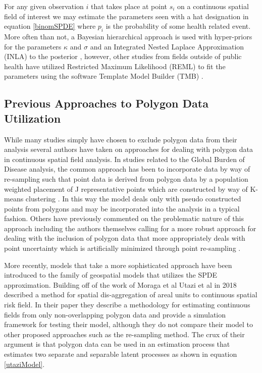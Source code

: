 \documentclass{article}
\begin{document}
For any given observation $i$ that takes place at point $s_i$ on a continuous spatial field of interest we may estimate the parameters seen with a hat designation in equation \ref{binomSPDE} where $p_i$ is the probability of some health related event. More often than not, a Bayesian hierarchical approach is used with hyper-priors for the parameters $\kappa$ and $\sigma$ \cite{Burke2016, Reiner2018, Utazi2018a, Wakefield2017} and an Integrated Nested Laplace Approximation (INLA) to the posterior \cite{Rue2009}, however, other studies from fields outside of public health have utilized Restricted Maximum Likelihood (REML) to fit the parameters \cite{Gruss2018} using the software Template Model Builder (TMB) \cite{Kristensen2016a}.

\subsection{Previous Approaches to Polygon Data Utilization}

While many studies simply have chosen to exclude polygon data from their analysis \cite{Burke2016, Wakefield2017} several authors have taken on approaches for dealing with polygon data in continuous spatial field analysis. In studies related to the Global Burden of Disease analysis, the common approach has been to incorporate data by way of re-sampling such that point data is derived from polygon data by a population weighted placement of J representative points which are constructed by way of K-means clustering \cite{Golding2017, Reiner2018}. In this way the model deals only with pseudo constructed points from polygons and may be incorporated into the analysis in a typical fashion. Others have previously commented on the problematic nature of this approach \cite{Wakefield2017} including the authors themselves calling for a more robust approach for dealing with the inclusion of polygon data that more appropriately deals with point uncertainty which is artificially minimized through point re-sampling \cite{Golding2017}.

More recently, models that take a more sophisticated approach have been introduced to the family of geospatial models that utilizes the SPDE approximation. Building off of the work of Moraga et al \cite{Moraga2017} Utazi et al in 2018 described a method for spatial dis-aggregation of areal units to continuous spatial risk field. In their paper they describe a methodology for estimating continuous fields from only non-overlapping polygon data and provide a simulation framework for testing their model, although they do not compare their model to other proposed approaches such as the re-sampling method. The crux of their argument is that polygon data can be used in an estimation process that estimates two separate and separable latent processes as shown in equation \ref{utaziModel}.
\end{document}

